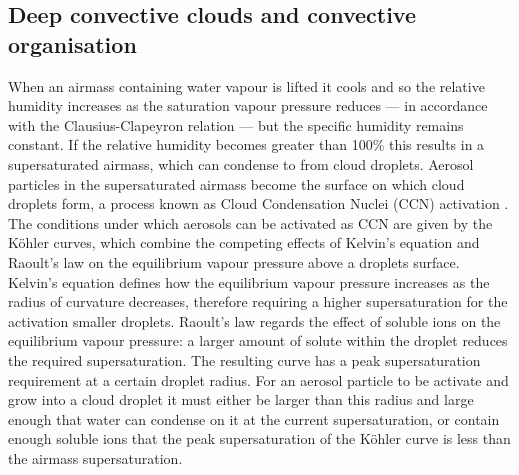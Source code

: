 
\subsection{Deep convective clouds and convective organisation}

When an airmass containing water vapour is lifted it cools and so the relative humidity increases as the saturation vapour pressure reduces --- in accordance with the Clausius-Clapeyron relation --- but the specific humidity remains constant. 
If the relative humidity becomes greater than 100\% this results in a supersaturated airmass, which can condense to from cloud droplets.
Aerosol particles  in the supersaturated airmass become the surface on which cloud droplets form, a process known as Cloud Condensation Nuclei (CCN) activation \citep{acci}.
The conditions under which aerosols can be activated as CCN are given by the K{\"o}hler curves, which combine the competing effects of Kelvin's equation and Raoult's law on the equilibrium vapour pressure above a droplets surface. 
Kelvin's equation defines how the equilibrium vapour pressure increases as the radius of curvature decreases, therefore requiring a higher supersaturation for the activation smaller droplets. 
Raoult's law regards the effect of soluble ions on the equilibrium vapour pressure: a larger amount of solute within the droplet reduces the required supersaturation. The resulting curve has a peak supersaturation requirement at a certain droplet radius. 
For an aerosol particle to be activate and grow into a cloud droplet it must either be larger than this radius and large enough that water can condense on it at the current supersaturation, or contain enough soluble ions that the peak supersaturation of the K{\"o}hler curve is less than the airmass supersaturation.


